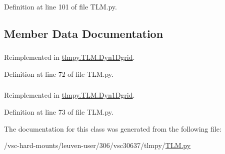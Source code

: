 Definition at line 101 of file TLM.py.

\subsection{Member Data Documentation}
\hypertarget{classtlmpy_1_1TLM_1_1Stat1Dgrid_af21254e11378e0805b2f889ff67ed7ca}{
\subsubsection[{N}]{}}
\label{classtlmpy_1_1TLM_1_1Stat1Dgrid_af21254e11378e0805b2f889ff67ed7ca}


Reimplemented in \hyperlink{classtlmpy_1_1TLM_1_1Dyn1Dgrid_a48bfd2e785c78b828224a9f4c3d533b6}{tlmpy.TLM.Dyn1Dgrid}.

Definition at line 72 of file TLM.py.\hypertarget{classtlmpy_1_1TLM_1_1Stat1Dgrid_aa0157077758d4f103ef19ccdb557d454}{
\subsubsection[{shape}]{}}
\label{classtlmpy_1_1TLM_1_1Stat1Dgrid_aa0157077758d4f103ef19ccdb557d454}


Reimplemented in \hyperlink{classtlmpy_1_1TLM_1_1Dyn1Dgrid_ad81cd7879d4ed2338d8eeb18ca48e03e}{tlmpy.TLM.Dyn1Dgrid}.

Definition at line 73 of file TLM.py.

The documentation for this class was generated from the following file:\begin{DoxyCompactItemize}
\item 
/vsc-\/hard-\/mounts/leuven-\/user/306/vsc30637/tlmpy/\hyperlink{TLM_8py}{TLM.py}\end{DoxyCompactItemize}
